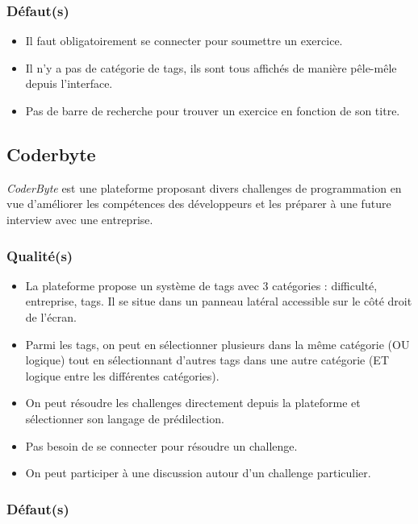 \subsubsection*{Défaut(s)}

\begin{itemize}
    \item Il faut obligatoirement se connecter pour soumettre un exercice.
    \item Il n'y a pas de catégorie de \glspl{tag}, ils sont tous affichés de manière pêle-mêle depuis l'interface.
    \item Pas de barre de recherche pour trouver un exercice en fonction de son titre.
\end{itemize}

\subsection*{Coderbyte}

\textit{CoderByte} est une plateforme proposant divers challenges de programmation en vue d'améliorer les compétences des développeurs et les préparer à une future interview avec une entreprise.

\subsubsection*{Qualité(s)}

\begin{itemize}
    \item La plateforme propose un système de \glspl{tag} avec 3 catégories : difficulté, entreprise, \glspl{tag}. Il se situe dans un panneau latéral accessible sur le côté droit de l'écran.
    \item Parmi les \glspl{tag}, on peut en sélectionner plusieurs dans la même catégorie (OU logique) tout en sélectionnant d'autres \glspl{tag} dans une autre catégorie (ET logique entre les différentes catégories).
    \item On peut résoudre les challenges directement depuis la plateforme et sélectionner son langage de prédilection.
    \item Pas besoin de se connecter pour résoudre un challenge.
    \item On peut participer à une discussion autour d'un challenge particulier.
\end{itemize}

\subsubsection*{Défaut(s)}

